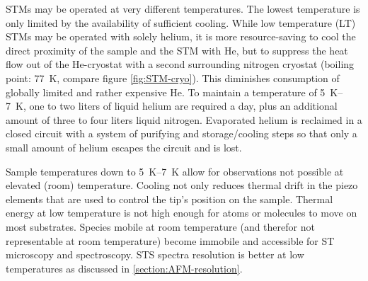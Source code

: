STMs may be operated at very different temperatures. The lowest temperature is only limited by the availability of sufficient cooling. While low temperature (LT) STMs may be operated with solely helium, it is more resource-saving to cool the direct proximity of the sample and the STM with He, but to suppress the heat flow out of the He-cryostat with a second surrounding nitrogen cryostat (boiling point: \SI{77}{\K}, compare figure \ref{fig:STM-cryo}). This diminishes consumption of globally limited and rather expensive He. To maintain a temperature of \SIrange{5}{7}{\K}, one to two liters of liquid helium are required a day, plus an additional amount of three to four liters liquid nitrogen. Evaporated helium is reclaimed in a closed circuit with a system of purifying and storage/cooling steps so that only a small amount of helium escapes the circuit and is lost.

Sample temperatures down to \SIrange{5}{7}{\K} allow for observations not possible at elevated (room) temperature. Cooling not only reduces thermal drift in the piezo elements that are used to control the tip's position on the sample. Thermal energy at low temperature is not high enough for atoms or molecules to move on most substrates. Species mobile at room temperature (and therefor not representable at room temperature) become immobile and accessible for ST microscopy and spectroscopy. STS spectra resolution is better at low temperatures as discussed in \ref{section:AFM-resolution}.

